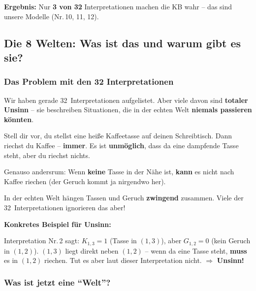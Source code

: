 \documentclass[a4paper,12pt]{article}
\begin{document}
\textbf{Ergebnis:} Nur \textbf{3 von 32} Interpretationen machen die KB wahr -- das sind unsere Modelle (Nr.\,10, 11, 12).


\subsection{Die 8 Welten: Was ist das und warum gibt es sie?}

\subsubsection*{Das Problem mit den 32 Interpretationen}

Wir haben gerade 32~Interpretationen aufgelistet. Aber viele davon
sind \textbf{totaler Unsinn} -- sie beschreiben Situationen, die in der
echten Welt \textbf{niemals passieren k\"onnten}.

\begin{analogie}[title={Analogie: Unsinnige Situationen}]
Stell dir vor, du stellst eine hei\ss e Kaffeetasse auf deinen
Schreibtisch. Dann riechst du Kaffee -- \textbf{immer}. Es ist
\textbf{unm\"oglich}, dass da eine dampfende Tasse steht, aber
du riechst nichts.

\medskip
Genauso andersrum: Wenn \textbf{keine} Tasse in der N\"ahe ist,
\textbf{kann} es nicht nach Kaffee riechen (der Geruch kommt ja
nirgendwo her).

\medskip
In der echten Welt h\"angen Tassen und Geruch \textbf{zwingend}
zusammen. Viele der 32~Interpretationen ignorieren das aber!
\end{analogie}

\textbf{Konkretes Beispiel f\"ur Unsinn:}

Interpretation Nr.\,2 sagt: $K_{1,3}=1$ (Tasse in $(1{,}3)$),
aber $G_{1,2}=0$ (kein Geruch in $(1{,}2)$).
$(1{,}3)$ liegt direkt neben $(1{,}2)$ -- wenn da eine Tasse steht,
\textbf{muss} es in $(1{,}2)$ riechen. Tut es aber laut dieser
Interpretation nicht. $\Rightarrow$ \textbf{Unsinn!}

\subsubsection*{Was ist jetzt eine "`Welt"'?}
\end{document}
